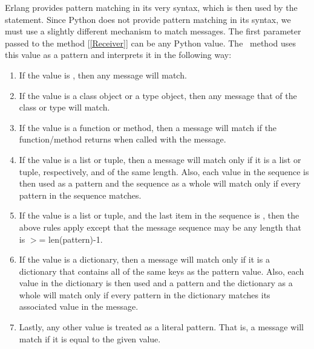 \documentclass{howto}
\newcommand{\greaterthan}[0]{\begin{math}>\end{math}}
\newcommand{\greaterthan}[0]{>}
\begin{document}
Erlang provides pattern matching in its very syntax, which is then used by the
 statement. Since Python does not provide pattern matching in
its syntax, we must use a slightly different mechanism to match messages. The
first parameter passed to the  method
[\ref{Receiver}] can be any Python value. The \addhandler\ method uses this
value as a pattern and interprets it in the following way:
\begin{enumerate}
	\item If the value is , then any message will match.
	\item If the value is a class object or a type object, then any message that
		 of the class or type will match.
	\item If the value is a function or method, then a message will match if the
		function/method returns  when called with the message.
	\item If the value is a list or tuple, then a message will match only if it
		is a list or tuple, respectively, and of the same length. Also, each value
		in the sequence is then used as a pattern and the sequence as a whole will
		match only if every pattern in the sequence matches.
	\item If the value is a list or tuple, and the last item in the sequence is
		, then the above rules apply except that
		the message sequence may be any length that is \greaterthan= len(pattern)-1.
	\item If the value is a dictionary, then a message will match only if it
		is a dictionary that contains all of the same keys as the pattern value.
		Also, each value in the dictionary is then used and a pattern and the
		dictionary as a whole will match only if every pattern in the dictionary
		matches its associated value in the message.
	\item Lastly, any other value is treated as a literal pattern. That is, a
		message will match if it is equal to the given value.
\end{enumerate}
\end{document}
